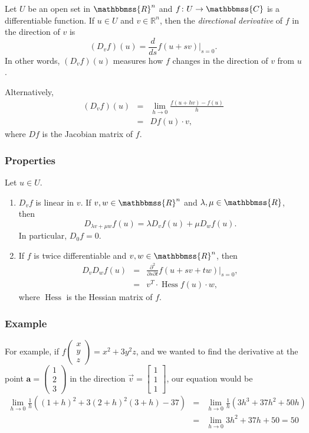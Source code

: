 \documentclass[12pt]{article}
\newcommand{\sR}[0]{\mathbb{R}}
\newcommand{\C}{\mathbbmss{C}}
\newcommand{\R}{\mathbbmss{R}}
\begin{document}
Let $U$ be an open set in $\R^n$ and $f\colon U\to \C$ is a differentiable
function. If $u\in U$ and $v\in \sR^n$, then the 
\emph{directional derivative} of $f$ in the direction of $v$ is
$$
  (D_v f)(u) = \frac{d}{ds} f(u+sv) \Big|_{s=0}.
$$
In other words, $(D_v f)(u)$ measures how $f$ changes in the direction of $v$
from $u$. 

Alternatively, 
\begin{eqnarray*}
 (D_v f)(u) &=& \lim_{h\to 0} \frac{ f(u+ hv) - f(u)}{h} \\
   &=& Df(u)\cdot v,
\end{eqnarray*}
where $Df$ is the Jacobian matrix of $f$.

\subsubsection*{Properties}
Let $u\in U$. 
\begin{enumerate}
\item $D_v f$ is linear in $v$. If $v, w\in \R^n$ and $\lambda, \mu \in \R$, 
then 
$$
   D_{\lambda v+\mu w}f(u) =    \lambda D_{v}f(u) +\mu D_{w}f(u).
$$
In particular, $D_0 f=0$.
\item If $f$ is twice differentiable and $v,w\in \R^n$, then 
\begin{eqnarray*}
   D_v D_w f(u) &=& \frac{\partial^2}{\partial s\partial t} f(u+sv + tw) \Big|_{s=0}, \\
     &=& v^T\cdot \operatorname{Hess}f(u)\cdot w,
\end{eqnarray*}
where $\operatorname{Hess}$ is the Hessian matrix of $f$. 
\end{enumerate}

\subsubsection*{Example}
For example, if $f\left(\begin{array}{c}x\\y\\z\end{array}\right) = x^2 + 3y^2z$, and we wanted to find the derivative at the point $\mathbf{a}=\left(\begin{array}{c}1\\2\\3\end{array}\right)$ in the direction $\vec{v}=\left[\begin{array}{c}1\\1\\1\end{array}\right]$, our equation would be
\begin{eqnarray*}
\lim_{h\rightarrow 0}\frac{1}{h}\left((1+h)^2 + 3(2+h)^2(3+h) - 37\right)
&=&\lim_{h\rightarrow 0}\frac{1}{h}(3h^3+37h^2+50h)\\
&=&\lim_{h\rightarrow 0}3h^2+37h +50 = 50\end{eqnarray*}
\end{document}
